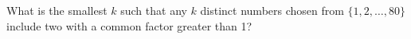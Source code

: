 What is the smallest $k$ such that any $k$ distinct numbers chosen from $\{1,2,\ldots,80\}$ include two with a common factor greater than 1?
